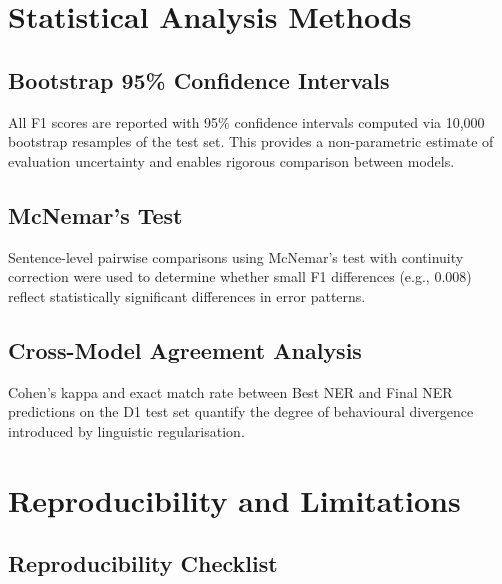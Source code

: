 \section{Statistical Analysis Methods}
\label{sec:statistical_methods}

\subsection{Bootstrap 95\% Confidence Intervals}
\label{subsec:bootstrap}

All F1 scores are reported with 95\% confidence intervals computed via 10,000 bootstrap resamples \cite{efron1994bootstrap} of the test set. This provides a non-parametric estimate of evaluation uncertainty and enables rigorous comparison between models.

\subsection{McNemar’s Test}
\label{subsec:mcnemar}

Sentence-level pairwise comparisons using McNemar's test \cite{mcnemar1947note} with continuity correction were used to determine whether small F1 differences (e.g., 0.008) reflect statistically significant differences in error patterns.

\subsection{Cross-Model Agreement Analysis}
\label{subsec:agreement}

Cohen’s kappa \cite{cohen1960kappa} and exact match rate between Best NER and Final NER predictions on the D1 test set quantify the degree of behavioural divergence introduced by linguistic regularisation.

\section{Reproducibility and Limitations}
\label{sec:reproducibility}

\subsection{Reproducibility Checklist}
\label{subsec:reproducibility_checklist}

